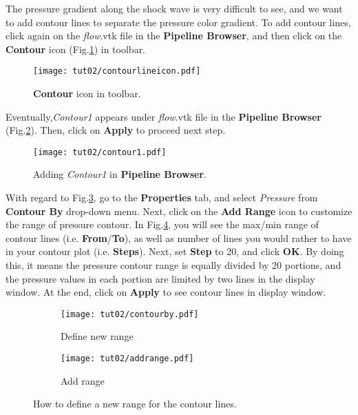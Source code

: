 The pressure gradient along the shock wave is very difficult to see, and we want to add contour lines to
separate the pressure color gradient. To add contour lines, click again on the \textit{flow}.vtk file in the \textbf{Pipeline Browser}, and then click on the \textbf{Contour} icon (Fig.\ref{fig:contour_icon}) in toolbar.
\begin{figure}[htbp]
    \centering
    \texttt{[image: tut02/contourlineicon.pdf]}
    \caption{\textbf{Contour} icon in toolbar.}
    \label{fig:contour_icon}
\end{figure}
Eventually,\textit{Contour1} appears under \textit{flow}.vtk file in the \textbf{Pipeline Browser} (Fig.\ref{fig:contour1}). Then, click on \textbf{Apply} to proceed next step.
\begin{figure}[htbp]
    \centering
    \texttt{[image: tut02/contour1.pdf]}
    \caption{Adding \textit{Contour1} in \textbf{Pipeline Browser}.}
    \label{fig:contour1}
\end{figure}
With regard to Fig.\ref{fig:contourby a}, go to the \textbf{Properties} tab, and select \textit{Pressure} from \textbf{Contour By} drop-down menu. Next, click on the \textbf{Add Range} icon to customize the range of pressure contour. In Fig.\ref{fig:contourby b}, you will see the max/min range of contour lines (i.e. \textbf{From}/\textbf{To}), as well as number of lines you would rather to have in your contour plot (i.e. \textbf{Steps}). Next, set \textbf{Step} to 20, and click \textbf{OK}. By doing this, it means the pressure contour range is equally divided by 20 portions, and the pressure values in each portion are limited by two lines in the display window. At the end, click on \textbf{Apply} to see contour lines in display window.
\begin{figure}[htbp]
    \centering
     \begin{subfigure}[b]{.4\textwidth}
         \centering
         \texttt{[image: tut02/contourby.pdf]}
         \caption{Define new range}
         \label{fig:contourby a}
     \end{subfigure}
     \hfill
     \begin{subfigure}[b]{.4\textwidth}
         \centering
         \texttt{[image: tut02/addrange.pdf]}
         \caption{Add range}
         \label{fig:contourby b}
     \end{subfigure}     
    \caption{How to define a new range for the contour lines.}
    \label{fig:contourby}
\end{figure}
